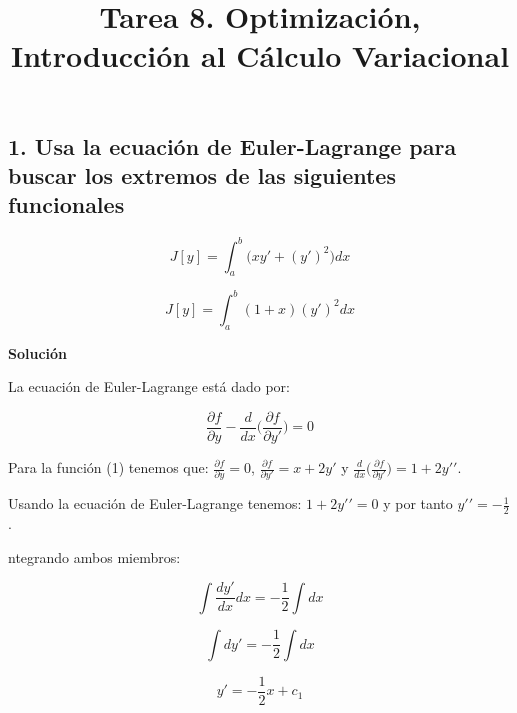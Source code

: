 \documentclass[conference]{IEEEtran}
\begin{document}
\title{Tarea 8. Optimización, Introducción al Cálculo Variacional}

\author{
}

\maketitle


\subsection*{1. Usa la ecuación de Euler-Lagrange para buscar los extremos de las siguientes funcionales}

\begin{equation}
    J[y] = \int_{a}^{b} \big( xy\prime + (y\prime)^2 \big)dx
\end{equation}

\begin{equation}
    J[y] = \int_{a}^{b} (1+x) (y\prime)^2 dx
\end{equation}

\textbf{Solución}

La ecuación de Euler-Lagrange está dado por:

\begin{equation*}
    \frac{\partial f}{\partial y} - \frac{d}{dx} \Big(\frac{\partial f}{\partial y\prime}\Big) = 0
\end{equation*}

Para la función (1) tenemos que: $\frac{\partial f}{\partial y} = 0$,
$\frac{\partial f}{\partial y\prime} = x + 2y\prime$ y
$\frac{d}{dx} \Big(\frac{\partial f}{\partial y\prime}\Big) = 1 + 2y\prime\prime$.

Usando la ecuación de Euler-Lagrange tenemos: $1 + 2y\prime\prime = 0$ y por tanto
$y\prime\prime = - \frac{1}{2}$.

ntegrando ambos miembros:

\begin{equation*}
    \int \frac{d y\prime}{dx} dx = - \frac{1}{2} \int dx
\end{equation*}

\begin{equation*}
    \int d y\prime = - \frac{1}{2} \int dx
\end{equation*}

\begin{equation*}
    y\prime = - \frac{1}{2} x + c_1
\end{equation*}
\end{document}
